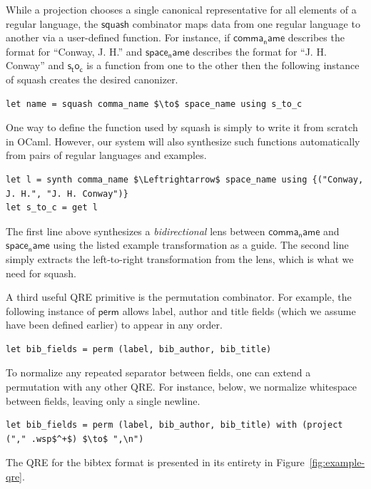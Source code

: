 \documentclass[acmsmall,review,anonymous]{acmart}\settopmatter{printfolios=true,printccs=false,printacmref=false}
\newcommand{\kw}[1]{\ensuremath{\mathsf{#1}}}
\newcommand{\codefont}[1]{\ensuremath{\mathsf{#1}}}
\newcommand{\bibtex}{\textsc{Bib}\TeX{}}
\begin{document}
While a projection chooses a single canonical representative for all elements
of a regular language, the \kw{squash} combinator maps data from one
regular language to another via a user-defined
function.  For instance,
if \codefont{comma_name} describes the format for ``Conway, J. H.''
and \codefont{space_name} describes the format for ``J. H. Conway''
and \codefont{s_to_c} is a function from one to the other then
the following instance of squash creates the desired canonizer.


\begin{lstlisting}
let name = squash comma_name $\to$ space_name using s_to_c
\end{lstlisting}

One way to define the function used by squash is simply to write it
from scratch in OCaml.  However, our system will also synthesize
such functions automatically from pairs of regular languages and
examples.
%
\begin{lstlisting}
let l = synth comma_name $\Leftrightarrow$ space_name using {("Conway, J. H.", "J. H. Conway")}
let s_to_c = get l
\end{lstlisting}
%
The first line above synthesizes a \emph{bidirectional} lens between
\codefont{comma_name} and \codefont{space_name} using the listed example
transformation as a guide.  The second line simply
extracts the left-to-right transformation from the lens, which is what we need for squash.

A third useful QRE primitive is the permutation combinator.  For example,
the following instance of \kw{perm} allows label, author and title fields
(which we assume have been defined earlier) to appear in any order.
%
\begin{lstlisting}
let bib_fields = perm (label, bib_author, bib_title) 
\end{lstlisting}
%
To normalize any repeated separator between fields, one can extend a permutation
with any other QRE.  For instance, below, we normalize whitespace between fields,
leaving only a single newline.
%
\begin{lstlisting}
let bib_fields = perm (label, bib_author, bib_title) with (project ("," .wsp$^+$) $\to$ ",\n")
\end{lstlisting}
%
\noindent
The QRE for the bibtex format is presented in its entirety in Figure~\ref{fig:example-qre}.
\end{document}
